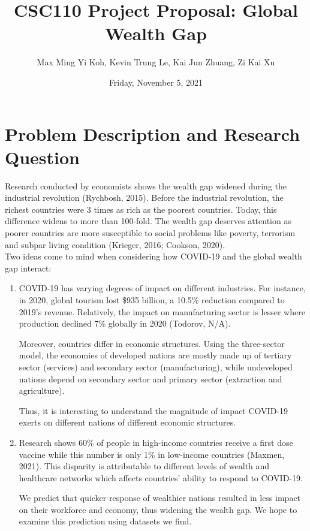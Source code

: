 \documentclass[fontsize=11pt]{article}
\title{CSC110 Project Proposal: Global Wealth Gap}
\author{Max Ming Yi Koh, Kevin Trung Le, Kai Jun Zhuang, Zi Kai Xu}
\date{Friday, November 5, 2021}
\begin{document}
\maketitle

\section*{Problem Description and Research Question}
Research conducted by economists shows the wealth gap widened during the industrial revolution (Rychbosh, 2015). Before the industrial revolution, the richest countries were 3 times as rich as the poorest countries. Today, this difference widens to more than 100-fold. The wealth gap deserves attention as poorer countries are more susceptible to social problems like poverty, terrorism and subpar living condition (Krieger, 2016; Cookson, 2020).  \\

\noindent Two ideas come to mind when considering how COVID-19 and the global wealth gap interact:

\begin{enumerate}
    \item COVID-19 has varying degrees of impact on different industries. For instance, in 2020, global tourism lost \$935 billion, a 10.5\% reduction compared to 2019’s revenue. Relatively, the impact on manufacturing sector is lesser where production declined 7\% globally in 2020 (Todorov, N/A).

    Moreover, countries differ in economic structures. Using the three-sector model, the economies of developed nations are mostly made up of tertiary sector (services) and secondary sector (manufacturing), while undeveloped nations depend on secondary sector and primary sector (extraction and agriculture).

    Thus, it is interesting to understand the magnitude of impact COVID-19 exerts on different nations of different economic structures.

    \item Research shows 60\% of people in high-income countries receive a first dose vaccine while this number is only 1\% in low-income countries (Maxmen, 2021). This disparity is attributable to different levels of wealth and healthcare networks which affects countries’ ability to respond to COVID-19.

    We predict that quicker response of wealthier nations resulted in less impact on their workforce and economy, thus widening the wealth gap. We hope to examine this prediction using datasets we find.
\end{enumerate}
\end{document}
